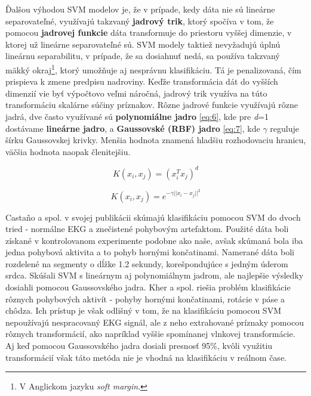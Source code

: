 Ďalšou výhodou SVM modelov je, že v prípade, kedy dáta nie sú lineárne separovateľné, využívajú takzvaný \textbf{jadrový trik}, ktorý spočíva v tom, že pomocou \textbf{jadrovej funkcie} dáta transformuje do priestoru vyššej dimenzie, v ktorej už lineárne separovateľné sú. SVM modely taktiež nevyžadujú úplnú lineárnu separabilitu, v prípade, že sa dosiahnuť nedá, sa používa takzvaný mäkký okraj\footnote{V Anglickom jazyku \textit{soft margin}.}, ktorý umožňuje aj nesprávnu klasifikáciu. Tá je penalizovaná, čím prispieva k zmene predpisu nadroviny. Keďže transformácia dát do vyšších dimenzií vie byť výpočtovo veľmi náročná, jadrový trik využíva na túto transformáciu skalárne súčiny príznakov. Rôzne jadrové funkcie využívajú rôzne jadrá, dve často využívané sú \textbf{polynomiálne jadro} \ref{eq:6}, kde pre \textit{d}=1 dostávame \textbf{lineárne jadro}, a \textbf{Gaussovské (RBF) jadro} \ref{eq:7}, kde \textit{\( \gamma \)} reguluje šírku Gaussovskej krivky. Menšia hodnota znamená hladšiu rozhodovaciu hranicu, väčšia hodnota naopak členitejšiu.\cite{Cristianini_Scholkopf_2002}\cite{Suthaharan2016}

\vspace{5pt}
\noindent
\begin{minipage}[t]{.45\textwidth}
    \begin{equation} 
        \label{eq:6}
        K(x_i,x_j) = (x_i^{T} x_j)^{d}
    \end{equation}
\end{minipage}
\hfill
\begin{minipage}[t]{.45\textwidth}
    \begin{equation} 
        \label{eq:7}
        K(x_i,x_j) = {e^{-\gamma ||x_i - x_j||^{2}}}
    \end{equation}
\end{minipage}
\vspace{5pt}

Castaño a spol.\cite{Castao2017} v svojej publikácii skúmajú klasifikáciu pomocou SVM do dvoch tried - normálne EKG a znečistené pohybovým artefaktom. Použité dáta boli získané v kontrolovanom experimente podobne ako naše, avšak skúmaná bola iba jedna pohybová aktivita a to pohyb hornými končatinami. Namerané dáta boli rozdelené na segmenty o dĺžke 1.2 sekundy, korešpondujúce s jedným úderom srdca. Skúšali SVM s lineárnym aj polynomiálnym jadrom, ale najlepšie výsledky dosiahli pomocou Gaussovského jadra. Kher a spol.\cite{Kher2015} riešia problém klasifikácie rôznych pohybových aktivít - pohyby hornými končatinami, rotácie v páse a chôdza. Ich prístup je však odlišný v tom, že na klasifikáciu pomocou SVM nepoužívajú nespracovaný EKG signál, ale z neho extrahované príznaky pomocou rôznych transformácií, ako napríklad vyššie spomínanej vlnkovej transformácie. Aj keď pomocou Gaussovského jadra dosiali presnosť 95\%, kvôli využitiu transformácií však táto metóda nie je vhodná na klasifikáciu v reálnom čase.


